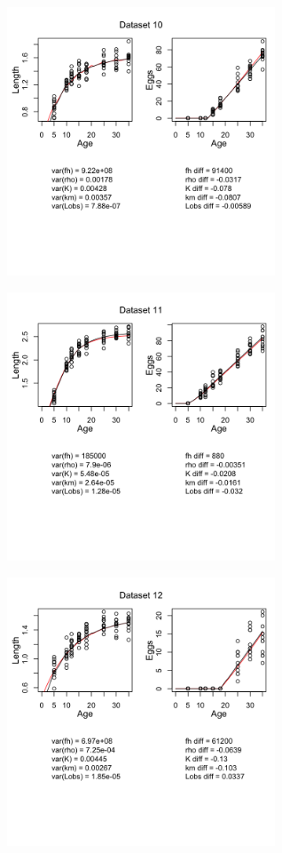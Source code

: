 \documentclass[12pt,reqno,final,pdftex]{amsart}\usepackage[]{graphicx}\usepackage[]{color}
\newenvironment{knitrout}{}{} %
\theoremstyle{plain}
\numberwithin{equation}{part}
\begin{document}
\begin{knitrout}
\includegraphics[width=0.6\textwidth]{figure/unnamed-chunk-5-10} \hfill{}




\includegraphics[width=0.6\textwidth]{figure/unnamed-chunk-5-11} \hfill{}




\includegraphics[width=0.6\textwidth]{figure/unnamed-chunk-5-12} \hfill{}





\end{knitrout}
\end{document}
